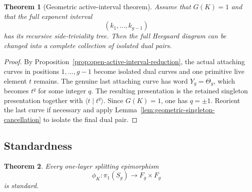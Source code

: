 \documentclass{article}
\newtheorem{theorem}{Theorem}[section]
\begin{document}
\begin{theorem}[Geometric active-interval theorem]
\label{thm:geometric-active-interval}
Assume that $G(K)=1$ and that the full exponent interval
\[
 (k_1,\ldots,k_{g-1})
\]
has its recursive side-triviality tree.  Then the full Heegaard diagram can
be changed into a complete collection of isolated dual pairs.
\end{theorem}

\begin{proof}
By Proposition~\ref{prop:open-active-interval-reduction}, the actual
attaching curves in positions $1,\ldots,g-1$ become isolated dual curves and
one primitive live element $t$ remains.  The genuine last attaching curve
has word $Y_g=\Theta_g$, which becomes $t^q$ for some integer $q$.  The
resulting presentation is the retained singleton presentation together with
\(
 \langle t\mid t^q\rangle.
\)
Since $G(K)=1$, one has $q=\pm1$.  Reorient the last curve if necessary and
apply Lemma~\ref{lem:geometric-singleton-cancellation} to isolate the final
dual pair.
\end{proof}

\subsection{Standardness }

\begin{theorem}\label{th:14}
Every  one-layer splitting epimorphism
\[
 \phi_K:\pi_1(S_g)\longrightarrow F_g\times F_g
\]
is standard.
\end{theorem}
\end{document}
